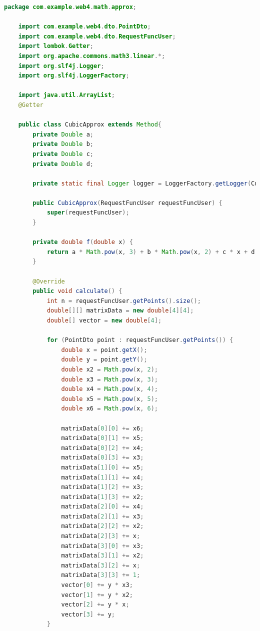 \documentclass{article}
\begin{document}
\begin{lstlisting}[language=Java, caption={Кубическая аппроксимация}]
    package com.example.web4.math.approx;

    import com.example.web4.dto.PointDto;
    import com.example.web4.dto.RequestFuncUser;
    import lombok.Getter;
    import org.apache.commons.math3.linear.*;
    import org.slf4j.Logger;
    import org.slf4j.LoggerFactory;
    
    import java.util.ArrayList;
    @Getter
    
    public class CubicApprox extends Method{
        private Double a;
        private Double b;
        private Double c;
        private Double d;
    
        private static final Logger logger = LoggerFactory.getLogger(CubicApprox.class);
    
        public CubicApprox(RequestFuncUser requestFuncUser) {
            super(requestFuncUser);
        }
    
        private double f(double x) {
            return a * Math.pow(x, 3) + b * Math.pow(x, 2) + c * x + d;
        }
    
        @Override
        public void calculate() {
            int n = requestFuncUser.getPoints().size();
            double[][] matrixData = new double[4][4];
            double[] vector = new double[4];
    
            for (PointDto point : requestFuncUser.getPoints()) {
                double x = point.getX();
                double y = point.getY();
                double x2 = Math.pow(x, 2);
                double x3 = Math.pow(x, 3);
                double x4 = Math.pow(x, 4);
                double x5 = Math.pow(x, 5);
                double x6 = Math.pow(x, 6);
    
                matrixData[0][0] += x6;
                matrixData[0][1] += x5;
                matrixData[0][2] += x4;
                matrixData[0][3] += x3;
                matrixData[1][0] += x5;
                matrixData[1][1] += x4;
                matrixData[1][2] += x3;
                matrixData[1][3] += x2;
                matrixData[2][0] += x4;
                matrixData[2][1] += x3;
                matrixData[2][2] += x2;
                matrixData[2][3] += x;
                matrixData[3][0] += x3;
                matrixData[3][1] += x2;
                matrixData[3][2] += x;
                matrixData[3][3] += 1;
                vector[0] += y * x3;
                vector[1] += y * x2;
                vector[2] += y * x;
                vector[3] += y;
            }
    

\end{lstlisting}
\end{document}
